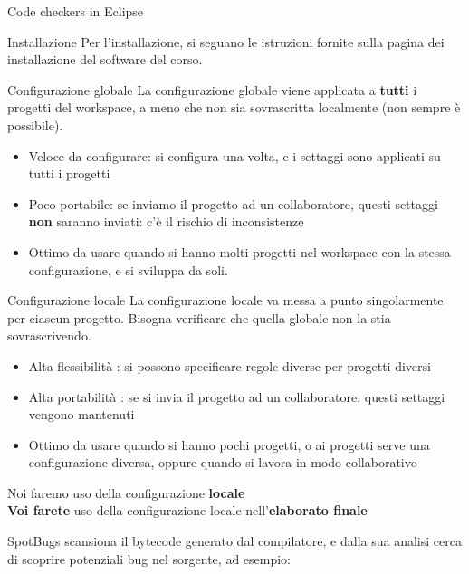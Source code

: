 \documentclass[presentation]{beamer}
\begin{document}
\begin{frame}[allowframebreaks]{Code checkers in Eclipse}
	\begin{block}{Installazione}
		Per l'installazione, si seguano le istruzioni fornite sulla pagina dei installazione del software del corso.
	\end{block}
	\begin{block}{Configurazione globale}
	La configurazione globale viene applicata a \textbf{tutti} i progetti del workspace, a meno che non sia sovrascritta localmente (non sempre è possibile).
		\begin{itemize}
			\item Veloce da configurare: si configura una volta, e i settaggi sono applicati su tutti i progetti
			\item Poco portabile: se inviamo il progetto ad un collaboratore, questi settaggi \textbf{non} saranno inviati: c'è il rischio di inconsistenze
			\item Ottimo da usare quando si hanno molti progetti nel workspace con la stessa configurazione, e si sviluppa da soli.
		\end{itemize}
	\end{block}
	\begin{block}{Configurazione locale}
	La configurazione locale va messa a punto singolarmente per ciascun progetto. Bisogna verificare che quella globale non la stia sovrascrivendo.
		\begin{itemize}
			\item Alta flessibilità : si possono specificare regole diverse per progetti diversi
			\item Alta portabilità : se si invia il progetto ad un collaboratore, questi settaggi vengono mantenuti
			\item Ottimo da usare quando si hanno pochi progetti, o ai progetti serve una configurazione diversa, oppure quando si lavora in modo collaborativo
		\end{itemize}
	\end{block}
	\begin{center}
		Noi faremo uso della configurazione \textbf{locale} \\
		\textbf{Voi farete} uso della configurazione locale nell'\textbf{elaborato finale}
	\end{center}
\end{frame}

 {
   {
      SpotBugs scansiona il bytecode generato dal compilatore, e dalla sua analisi cerca di scoprire potenziali bug nel sorgente, ad esempio:
  }
}
\end{document}
